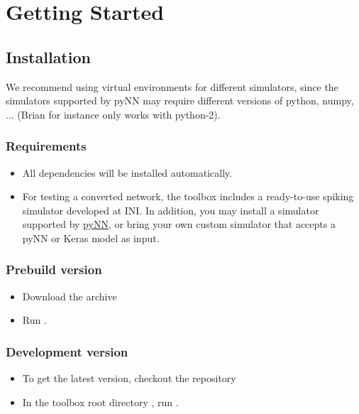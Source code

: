 \documentclass[letterpaper,10pt,english]{sphinxmanual}
\begin{document}
\section{Getting Started}
\label{getting_started:getting-started}\label{getting_started::doc}

\subsection{Installation}
\label{getting_started:installation}
We recommend using virtual environments for different simulators, since the simulators
supported by pyNN may require different versions of python, numpy, ...
(Brian for instance only works with python-2).


\subsubsection{Requirements}
\label{getting_started:requirements}\begin{itemize}
\item {} 
All dependencies will be installed automatically.

\item {} 
For testing a converted network, the toolbox includes a ready-to-use spiking
simulator developed at INI. In addition, you may install a simulator supported
by \href{http://neuralensemble.org/docs/PyNN/}{pyNN}, or bring your own custom
simulator that accepts a pyNN or Keras model as input.

\end{itemize}


\subsubsection{Prebuild version}
\label{getting_started:prebuild-version}\begin{itemize}
\item {} 
Download the archive 

\item {} 
Run .

\end{itemize}


\subsubsection{Development version}
\label{getting_started:development-version}\begin{itemize}
\item {} 
To get the latest version, checkout the repository

\item {} 
In the toolbox root directory , run .

\end{itemize}
\end{document}
